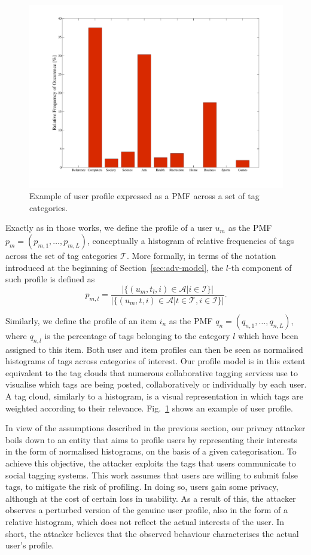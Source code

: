 \begin{figure}[htb]
\includegraphics[width=\textwidth]{figures/UPRel.pdf}
\caption[User PMF.]{Example of user profile expressed as a PMF across a set of tag categories.
\label{fig:UserProfile}}
\end{figure}

Exactly as in those works, we define the profile of a user $u_m$ as the PMF $p_m = (p_{m,1},\ldots, p_{m,L})$, conceptually a histogram of relative frequencies of tags across the set of tag categories $\mathcal{T}$. More formally, in terms of the notation introduced at the beginning of Section~\ref{sec:adv-model}, the $l$-th component of such profile is defined as
$$p_{m,l} = \frac{|\{(u_m,t_l,i)\in\mathcal{A} | i\in\mathcal{I}\}|}{|\{(u_m,t,i)\in\mathcal{A} | t\in\mathcal{T}, i\in\mathcal{I}\}|}.$$

Similarly, we define the profile of an item $i_n$ as the PMF $q_n =(q_{n,1},\ldots, q_{n,L})$, where $q_{n,l}$ is the percentage of tags belonging to the category $l$ which have been assigned to this item. Both user and item profiles can then be seen as normalised histograms of tags across categories of interest. Our profile model is in this extent equivalent to the tag clouds that numerous collaborative tagging services use to visualise which tags are being posted, collaboratively or individually by each user. A tag cloud, similarly to a histogram, is a visual representation in which tags are weighted according to their relevance. Fig.~\ref{fig:UserProfile} shows an example of user profile.

In view of the assumptions described in the previous section, our privacy attacker boils down to an entity that aims to profile users by representing their interests in the form of normalised histograms, on the basis of a given categorisation.
To achieve this objective, the attacker exploits the tags that users communicate to social tagging systems. This work assumes that users are willing to submit false tags, to mitigate the risk of profiling. In doing so, users gain some privacy, although at the cost of certain loss in usability. As a result of this, the attacker observes a perturbed version of the genuine user profile, also in the form of a relative histogram, which does not reflect the actual interests of the user. In short, the attacker believes that the observed behaviour characterises the actual user's profile.

